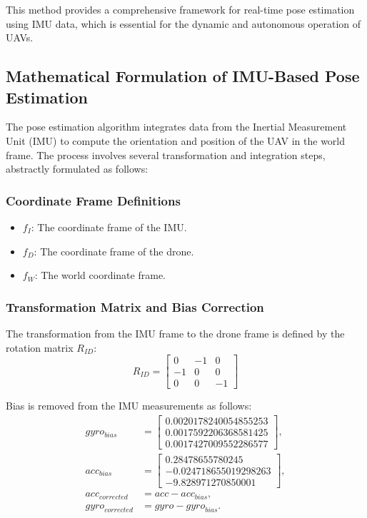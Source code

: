 This method provides a comprehensive framework for real-time pose estimation using IMU data, which is essential for the dynamic and autonomous operation of UAVs.


\subsection{Mathematical Formulation of IMU-Based Pose Estimation}
The pose estimation algorithm integrates data from the Inertial Measurement Unit (IMU) to compute the orientation and position of the UAV in the world frame. The process involves several transformation and integration steps, abstractly formulated as follows:

\subsubsection{Coordinate Frame Definitions}

\begin{itemize}
    \item \( {f}_{I} \): The coordinate frame of the IMU.
    \item \( {f}_{D} \): The coordinate frame of the drone.
    \item \( {f}_{W} \): The world coordinate frame.
\end{itemize}

\subsubsection{Transformation Matrix and Bias Correction}
The transformation from the IMU frame to the drone frame is defined by the rotation matrix \({R}_{ID} \):
\begin{equation}
    {R}_{ID} = \begin{bmatrix}
    0 & -1 & 0 \\
    -1 & 0 & 0 \\
    0 & 0 & -1 
    \end{bmatrix}
\end{equation}

Bias is removed from the IMU measurements as follows:
\begin{align}
    gyro_{bias} &= \begin{bmatrix} 0.0020178240054855253 \\ 0.0017592206368581425 \\ 0.0017427009552286577 \end{bmatrix}, \\
    {acc}_{bias} &= \begin{bmatrix} 0.28478655780245 \\ -0.024718655019298263 \\ -9.828971270850001 \end{bmatrix}, \\
    {acc}_{corrected} &= {acc} - {acc}_{bias}, \\
    {gyro}_{corrected} &= {gyro} - {gyro}_{bias}.
\end{align}

